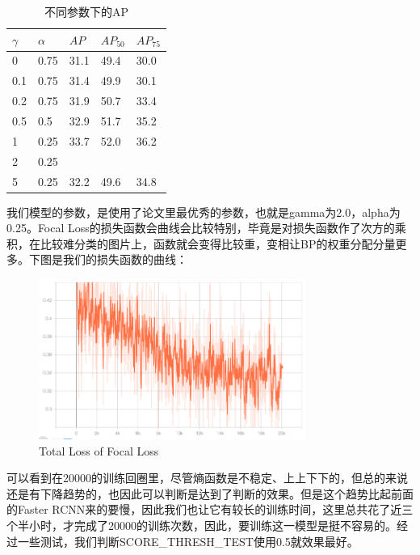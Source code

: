 \documentclass[journal,transmag]{IEEEtran}
\begin{document}
\begin{table}[!htbp]
\small
\caption{不同参数下的AP}  
\begin{center}  
\begin{tabular}{|l|l|l|l|l|}  
\hline
$\gamma$ & $\alpha$ & $AP$ & $AP_{50}$ & $AP_{75}$\\ \hline
0 & 0.75 & 31.1 & 49.4 & 30.0\\ \hline
0.1 & 0.75 & 31.4 & 49.9 & 30.1\\ \hline
0.2 & 0.75 & 31.9 & 50.7 & 33.4\\ \hline
0.5 & 0.5 & 32.9 & 51.7 & 35.2\\ \hline
1 & 0.25 & 33.7 & 52.0 & 36.2\\ \hline
2 & 0.25 & {\color{red}{34.0}} & {\color{red}{52.5}} & {\color{red}{36.5}}\\ \hline
5 & 0.25 & 32.2 & 49.6 & 34.8\\ \hline
\end{tabular}  
\end{center}  
\end{table}

我们模型的参数，是使用了论文里最优秀的参数，也就是gamma为2.0，alpha为0.25。Focal Loss的损失函数会曲线会比较特别，毕竟是对损失函数作了次方的乘积，在比较难分类的图片上，函数就会变得比较重，变相让BP的权重分配分量更多。下图是我们的损失函数的曲线：
\begin{figure}[h]
\centering
\includegraphics[width=3.44in]{closs.png}
\caption{Total Loss of Focal Loss}
\end{figure}

可以看到在20000的训练回圈里，尽管熵函数是不稳定、上上下下的，但总的来说还是有下降趋势的，也因此可以判断是达到了判断的效果。但是这个趋势比起前面的Faster RCNN来的要慢，因此我们也让它有较长的训练时间，这里总共花了近三个半小时，才完成了20000的训练次数，因此，要训练这一模型是挺不容易的。经过一些测试，我们判断SCORE\_THRESH\_TEST使用0.5就效果最好。
\end{document}
